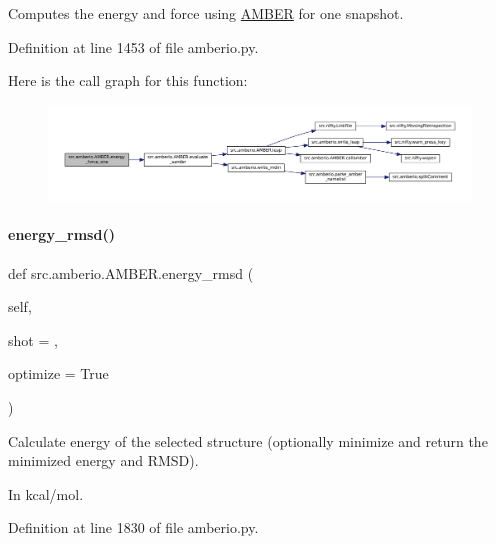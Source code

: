 Computes the energy and force using \hyperlink{classsrc_1_1amberio_1_1AMBER}{A\+M\+B\+ER} for one snapshot. 



Definition at line 1453 of file amberio.\+py.

Here is the call graph for this function\+:
\nopagebreak
\begin{figure}[H]
\begin{center}
\leavevmode
\includegraphics[width=350pt]{classsrc_1_1amberio_1_1AMBER_a6b67c489b262f485c3c71664ae241759_cgraph}
\end{center}
\end{figure}
\mbox{\label{classsrc_1_1amberio_1_1AMBER_a65250844e95082487cc7507785103e83}} 
\paragraph{\texorpdfstring{energy\+\_\+rmsd()}{energy\_rmsd()}}
{\footnotesize\ttfamily def src.\+amberio.\+A\+M\+B\+E\+R.\+energy\+\_\+rmsd (\begin{DoxyParamCaption}\item[{}]{self,  }\item[{}]{shot = {},  }\item[{}]{optimize = {\ttfamily True} }\end{DoxyParamCaption})}



Calculate energy of the selected structure (optionally minimize and return the minimized energy and R\+M\+SD). 

In kcal/mol. 

Definition at line 1830 of file amberio.\+py.

\mbox{\label{classsrc_1_1amberio_1_1AMBER_aebf6805d55d195578926031a77282daf}} 
